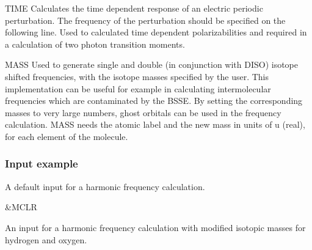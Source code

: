 \begin{keywordlist}
\item[TIME]
Calculates the time dependent response of an electric periodic perturbation.
The frequency of the perturbation should be specified on the following line.
Used to calculated time dependent polarizabilities and required in
a  calculation of two photon transition moments.
\item[MASS]
Used to generate single and double (in conjunction with DISO) isotope
shifted frequencies, with the isotope masses specified by the user.
This implementation can be useful for example in calculating
intermolecular frequencies which are contaminated by the BSSE.
By setting the corresponding masses to very large numbers, ghost orbitals
can be used in the frequency calculation.
MASS needs the atomic label and the new mass in units of u (real), for each element of the molecule.
\end{keywordlist}

\subsubsection{Input example}

A default input for a harmonic frequency calculation.

\begin{inputlisting}
 &MCLR
\end{inputlisting}

An input for a harmonic frequency calculation  with modified isotopic masses
for hydrogen and oxygen.

